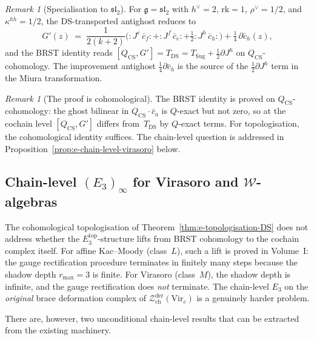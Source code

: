 \documentclass[11pt,reqno]{amsart}
\theoremstyle{definition}
\theoremstyle{remark}
\newtheorem{remark}[theorem]{Remark}
\providecommand{\cW}{\mathcal{W}}
\providecommand{\cZ}{\mathcal{Z}}
\providecommand{\fg}{\mathfrak{g}}
\providecommand{\Ethree}{E_3}
\begin{document}
\begin{remark}[Specialisation to $\mathfrak{sl}_2$]
\label{rem:e-DS-sl2}
For $\fg = \mathfrak{sl}_2$ with $h^\vee = 2$,
$\mathrm{rk} = 1$, $\rho^\vee = 1/2$, and $\kappa^{hh} = 1/2$,
the DS-transported antighost reduces to
\[
G'(z)
\;=\;
\frac{1}{2(k+2)}\bigl({:}J^e\,\bar c_f{:}
+ {:}J^f\,\bar c_e{:}
+ \tfrac{1}{2}{:}J^h\,\bar c_h{:}\bigr)
+ \tfrac{1}{4}\,\partial\bar c_h(z),
\]
and the BRST identity reads
$[Q_{\mathrm{CS}}, G'] = T_{\mathrm{DS}}
= T_{\mathrm{Sug}} + \frac{1}{2}\partial J^h$
on $Q_{\mathrm{CS}}$-cohomology.
The improvement antighost $\frac{1}{4}\partial\bar c_h$ is the
source of the $\frac{1}{2}\partial J^h$ term in the Miura
transformation.
\end{remark}

\begin{remark}[The proof is cohomological]
\label{rem:e-DS-cohomological}
The BRST identity is proved on $Q_{\mathrm{CS}}$-cohomology:
the ghost bilinear in $Q_{\mathrm{CS}} \cdot \bar c_a$ is
$Q$-exact but not zero, so at the cochain level
$[Q_{\mathrm{CS}}, G']$ differs from~$T_{\mathrm{DS}}$
by $Q$-exact terms.
For topologisation, the cohomological identity suffices.
The chain-level question is addressed in
Proposition~\ref{prop:e-chain-level-virasoro} below.
\end{remark}

\subsection{Chain-level $(\Ethree)_\infty$ for Virasoro
and $\cW$-algebras}
\label{subsec:chain-level-E3-virasoro}

The cohomological topologisation of
Theorem~\ref{thm:e-topologisation-DS} does not address
whether the $\Ethree^{\mathrm{top}}$-structure lifts from
BRST cohomology to the cochain complex itself.
For affine Kac--Moody (class~$L$), such a lift is proved in
Volume~I: the gauge rectification procedure terminates in
finitely many steps because the shadow depth
$r_{\max} = 3$ is finite.
For Virasoro (class~$M$), the shadow depth is infinite,
and the gauge rectification does \emph{not} terminate.
The chain-level $\Ethree$ on the \emph{original} brace
deformation complex of $\cZ^{\mathrm{der}}_{\mathrm{ch}}
(\mathrm{Vir}_c)$ is a genuinely harder problem.

There are, however, two unconditional chain-level results
that can be extracted from the existing machinery.
\end{document}
